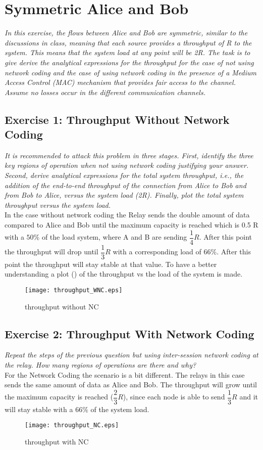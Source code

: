 \section{Symmetric Alice and Bob}
\textit{In this exercise, the flows between Alice and Bob are symmetric, similar to the discussions in class, meaning that each source provides a throughput of R to the system. This means that the system load at any point will be 2R. The task is to give derive the analytical expressions for the throughput for the case of not using network coding and the case of using network coding in the presence of a Medium Access Control (MAC) mechanism that provides fair access to the channel. Assume no losses occur in the different communication channels.}

\subsection{Exercise 1: Throughput Without Network Coding}
\textit{It is recommended to attack this problem in three stages. First, identify the three key regions of operation when not using network coding justifying your answer. Second, derive analytical expressions for the total system throughput, i.e., the addition of the end-to-end throughput of the connection from Alice to Bob and from Bob to Alice, versus the system load (2R). Finally, plot the total system throughput versus the system load.}\\

In the case without network coding the Relay sends the double amount of data compared to Alice and Bob until the maximum capacity is reached which is 0.5 R with a $50 \%$ of the load system, where A and B are sending $\dfrac{1}{4}R$. After this point the throughput will drop until $\dfrac{1}{3} R $ with a corresponding load of $66 \%$. After this point the throughput will stay stable at that value. To have a better understanding a plot () of the throughput vs the load of the system is made.
\begin{figure}[!h]
  \centering
  \texttt{[image: throughput\_WNC.eps]}
  \caption{throughput without NC}
  \label{fig:throughput_WNC}
\end{figure}

\subsection{Exercise 2: Throughput With Network Coding}
\textit{Repeat the steps of the previous question but using inter-session network coding at the relay. How many regions of operations are there and why?}\\

For the Network Coding the scenario is a bit different. The relays in this case sends the same amount of data as Alice and Bob. The throughput will grow until the maximum capacity is reached ($\dfrac{2}{3} R $), since each node is able to send $\dfrac{1}{3} R $ and it will stay stable with a $66 \%$ of the system load.  

\begin{figure}[!h]
  \centering
  \texttt{[image: throughput\_NC.eps]}
  \caption{throughput with NC}
  \label{fig:throughput_NC}
\end{figure}
